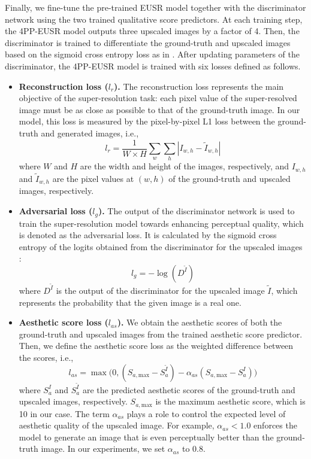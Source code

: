 \documentclass[runningheads]{llncs}
\begin{document}
Finally, we fine-tune the pre-trained EUSR model together with the discriminator network using the two trained qualitative score predictors.
At each training step, the 4PP-EUSR model outputs three upscaled images by a factor of 4.
Then, the discriminator is trained to differentiate the ground-truth and upscaled images based on the sigmoid cross entropy loss as in \cite{ledig2017photo}.
After updating parameters of the discriminator, the 4PP-EUSR model is trained with six losses defined as follows.
\begin{itemize}
	\item \textbf{Reconstruction loss (${l}_{r}$).}
	The reconstruction loss represents the main objective of the super-resolution task: each pixel value of the super-resolved image must be as close as possible to that of the ground-truth image.
	In our model, this loss is measured by the pixel-by-pixel L1 loss between the ground-truth and generated images, i.e.,
	\begin{equation}{l}_{r} = \frac{1}{W \times H} \sum_{w} \sum_{h} \left| {I}_{w, h} - \widetilde{{I}}_{w, h} \right|
	\end{equation}
	where $W$ and $H$ are the width and height of the images, respectively, and ${I}_{w, h}$ and $\widetilde{{I}}_{w, h}$ are the pixel values at $(w, h)$ of the ground-truth and upscaled images, respectively.
	
	\item \textbf{Adversarial loss (${l}_{g}$).}
	The output of the discriminator network is used to train the super-resolution model towards enhancing perceptual quality, which is denoted as the adversarial loss.
	It is calculated by the sigmoid cross entropy of the logits obtained from the discriminator for the upscaled images \cite{ledig2017photo}:
	\begin{equation}{l}_{g} = - \log({D}^{\widetilde{I}})
	\end{equation}
	where ${D}^{\widetilde{I}}$ is the output of the discriminator for the upscaled image $\widetilde{I}$, which represents the probability that the given image is a real one.
	
	\item \textbf{Aesthetic score loss (${l}_{as}$).}
	We obtain the aesthetic scores of both the ground-truth and upscaled images from the trained aesthetic score predictor.
	Then, we define the aesthetic score loss as the weighted difference between the scores, i.e.,
	\begin{equation}{l}_{as} = \max \big( 0, ({S}_{a,\textrm{max}} - {S}_{a}^{\widetilde{I}}) - \alpha_{as} ({S}_{a,\textrm{max}} - {S}_{a}^{I}) \big)
	\end{equation}
	where ${S}_{a}^{I}$ and ${S}_{a}^{\widetilde{I}}$ are the predicted aesthetic scores of the ground-truth and upscaled images, respectively.
	${S}_{a,\textrm{max}}$ is the maximum aesthetic score, which is 10 in our case.
	The term $\alpha_{as}$ plays a role to control the expected level of aesthetic quality of the upscaled image.
	For example, $\alpha_{as} < 1.0$ enforces the model to generate an image that is even perceptually better than the ground-truth image.
	In our experiments, we set $\alpha_{as}$ to 0.8.
	

\end{itemize}
\end{document}
